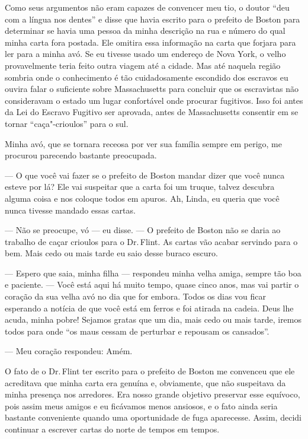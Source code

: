 Como seus argumentos não eram capazes
de convencer meu tio, o doutor ``deu com a língua nos dentes'' e disse
que havia escrito para o prefeito de Boston para determinar se havia uma
pessoa da minha descrição na rua e número do qual minha carta fora
postada. Ele omitira essa informação na carta que forjara para ler para
a minha avó. Se eu tivesse usado um endereço de Nova York, o velho
provavelmente teria feito outra viagem até a cidade. Mas até naquela
região sombria onde o conhecimento é tão cuidadosamente escondido dos
escravos eu ouvira falar o suficiente sobre Massachusetts para concluir
que os escravistas não consideravam o estado um lugar confortável onde
procurar fugitivos. Isso foi antes da Lei do Escravo Fugitivo ser
aprovada, antes de Massachusetts consentir em se tornar
``caça"-crioulos'' para o sul.

Minha avó, que se tornara receosa por
ver sua família sempre em perigo, me procurou parecendo bastante
preocupada.

--- O que você vai fazer se o prefeito de Boston mandar dizer que você
nunca esteve por lá? Ele vai suspeitar que a carta foi um truque, talvez
descubra alguma coisa e nos coloque todos em apuros. Ah, Linda, eu
queria que você nunca tivesse mandado essas cartas.

--- Não se preocupe, vó --- eu disse.
--- O prefeito de Boston não se daria ao trabalho de caçar crioulos para
o Dr.\,Flint. As cartas vão acabar servindo para o bem. Mais cedo ou mais
tarde eu saio desse buraco escuro.

--- Espero que saia, minha filha ---
respondeu minha velha amiga, sempre tão boa e paciente. --- Você está
aqui há muito tempo, quase cinco anos, mas vai partir o coração da sua
velha avó no dia que for embora. Todos os dias vou ficar esperando a
notícia de que você está em ferros e foi atirada na cadeia. Deus lhe
acuda, minha pobre! Sejamos gratas que um dia, mais cedo ou mais tarde,
iremos todos para onde ``os maus cessam de perturbar e repousam os
cansados''.

--- Meu coração respondeu: Amém.

O fato de o Dr.\,Flint ter escrito para
o prefeito de Boston me convenceu que ele acreditava que minha carta era
genuína e, obviamente, que não suspeitava da minha presença nos
arredores. Era nosso grande objetivo preservar esse equívoco, pois assim
meus amigos e eu ficávamos menos ansiosos, e o fato ainda seria bastante
conveniente quando uma oportunidade de fuga aparecesse. Assim, decidi
continuar a escrever cartas do norte de tempos em tempos.

